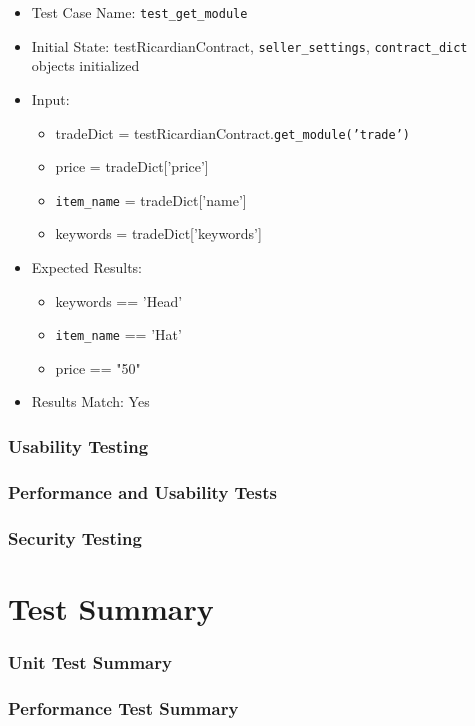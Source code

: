 \documentclass{article}
\begin{document}
\begin{itemize}
\item Test Case Name: \texttt{test\_get\_module}
\item Initial State: testRicardianContract, \texttt{seller\_settings}, \texttt{contract\_dict} objects initialized
\item Input:
\begin{itemize}
\item tradeDict = testRicardianContract.\texttt{get\_module('trade')}
\item price = tradeDict['price']
\item \texttt{item\_name} = tradeDict['name']
\item keywords = tradeDict['keywords']
\end{itemize} 
\item Expected Results:
\begin{itemize}
\item keywords == 'Head'
\item \texttt{item\_name} == 'Hat'
\item price == "50"
\end{itemize}
\item Results Match: Yes
\end{itemize}

\section{Usability Testing}

\section{Performance and Usability Tests}

\section{Security Testing}

\part*{Test Summary}
\section{Unit Test Summary}

\section{Performance Test Summary}
\end{document}
